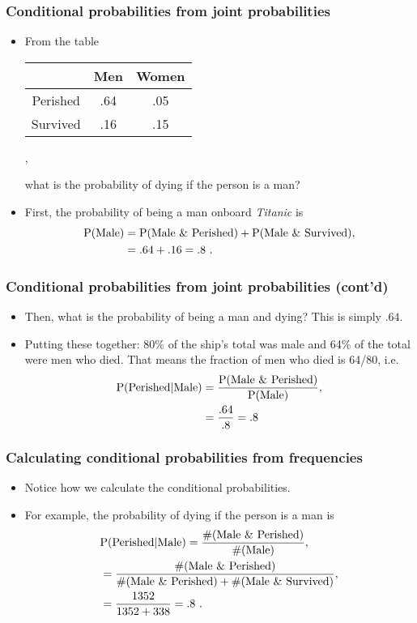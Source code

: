 \documentclass[10pt,xcolor=dvipsnames,serif,professionalfont]{beamer} %
\begin{document}
\begin{frame}
\frametitle{Conditional probabilities from joint probabilities}
\begin{itemize}
\item From the table
{\scriptsize
\begin{center}
\begin{tabular}{c|cc}
& Men & Women \\\hline
Perished & .64 & .05 \\
Survived & .16 & .15 \\
\end{tabular},
\end{center}
}
what is the probability of dying if the person is a man?
\item First, the probability of being a man onboard \emph{Titanic} is 
\begin{align}
\mathrm{P}( \textrm{Male} ) &= \mathrm{P}( \textrm{Male \& Perished} ) + \mathrm{P}( \textrm{Male \& Survived} ),\\
&= .64 + .16 = .8\ .
\end{align}
\end{itemize}
\end{frame}

\begin{frame}
\frametitle{Conditional probabilities from joint probabilities (cont'd)}
\begin{itemize}
\item Then, what is the probability of being a man and dying? This is simply $.64$.
\item Putting these together: 80\% of the ship's total was male and 64\% of the total were men who died. That means the fraction of men who died is 64/80, i.e.
\begin{align}
\mathrm{P}( \textrm{Perished} \vert \textrm{Male} ) &= \frac{\mathrm{P}( \textrm{Male \& Perished} )}{\mathrm{P}( \textrm{Male} )},\\
&= \frac{.64}{.8} = .8 
\end{align}
\end{itemize}
\end{frame}


\begin{frame}
\frametitle{Calculating conditional probabilities from frequencies}
\begin{itemize}
\item Notice how we calculate the conditional probabilities.
\item For example, the probability of dying if the person is a man is
\begin{align}
&\mathrm{P}( \textrm{Perished} \vert \textrm{Male} ) = \frac{\#(\textrm{Male \& Perished})}{\#(\textrm{Male})},\\
&= \frac{\#(\textrm{Male \& Perished})}{\#(\textrm{Male \& Perished}) + \#(\textrm{Male \& Survived})},\\
&= \frac{1352}{1352+338} = .8\ .
\end{align}
\end{itemize}
\end{frame}
\end{document}
